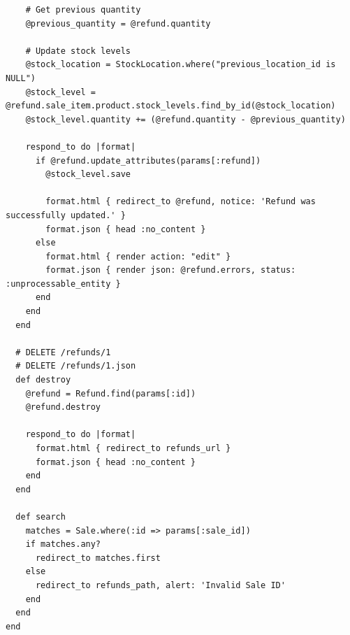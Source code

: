 \documentclass[a4paper]{article}
\begin{document}
\begin{verbatim}
    # Get previous quantity
    @previous_quantity = @refund.quantity
    
    # Update stock levels
    @stock_location = StockLocation.where("previous_location_id is NULL")
    @stock_level = @refund.sale_item.product.stock_levels.find_by_id(@stock_location)
    @stock_level.quantity += (@refund.quantity - @previous_quantity)

    respond_to do |format|
      if @refund.update_attributes(params[:refund])
        @stock_level.save
        
        format.html { redirect_to @refund, notice: 'Refund was successfully updated.' }
        format.json { head :no_content }
      else
        format.html { render action: "edit" }
        format.json { render json: @refund.errors, status: :unprocessable_entity }
      end
    end
  end

  # DELETE /refunds/1
  # DELETE /refunds/1.json
  def destroy
    @refund = Refund.find(params[:id])
    @refund.destroy

    respond_to do |format|
      format.html { redirect_to refunds_url }
      format.json { head :no_content }
    end
  end

  def search
    matches = Sale.where(:id => params[:sale_id])
    if matches.any?
      redirect_to matches.first
    else
      redirect_to refunds_path, alert: 'Invalid Sale ID'
    end
  end
end

\end{verbatim}
\end{document}
